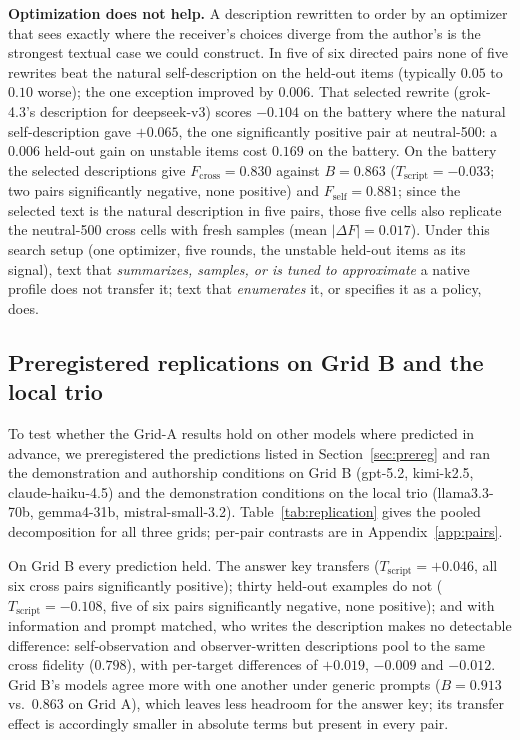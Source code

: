 \documentclass[11pt]{article}
\newcommand{\Fself}{F_{\mathrm{self}}}
\newcommand{\Fcross}{F_{\mathrm{cross}}}
\newcommand{\B}{B}
\newcommand{\Tscript}{T_{\mathrm{script}}}
\begin{document}
\textbf{Optimization does not help.} A description rewritten to order by an
optimizer that sees exactly where the receiver's choices diverge from the
author's is the strongest textual case we could construct. In five of six
directed pairs none of five rewrites beat the natural self-description on
the held-out items (typically $0.05$ to $0.10$ worse); the one exception
improved by $0.006$. That selected rewrite (grok-4.3's description for
deepseek-v3) scores $-0.104$ on the battery where the natural self-description gave $+0.065$,
the one significantly positive pair at neutral-500: a $0.006$
held-out gain on unstable items cost $0.169$ on the battery. On the battery
the selected descriptions give
$\Fcross = 0.830$ against $\B = 0.863$ ($\Tscript = -0.033$; two pairs
significantly negative, none positive) and $\Fself = 0.881$; since the
selected text is the natural description in five pairs, those five cells
also replicate the neutral-500 cross cells with fresh samples (mean
$|\Delta F| = 0.017$). Under this search setup (one optimizer, five rounds,
the unstable held-out items as its signal), text that \emph{summarizes,
samples, or is tuned to approximate} a native profile does not transfer it;
text that \emph{enumerates} it, or specifies it as a policy, does.

\subsection{Preregistered replications on Grid B and the local trio}
\label{sec:replication}
To test whether the Grid-A results hold on other models where predicted in
advance, we preregistered the predictions
listed in Section~\ref{sec:prereg} and ran the demonstration
and authorship conditions on Grid B (gpt-5.2, kimi-k2.5, claude-haiku-4.5)
and the demonstration conditions on the local trio (llama3.3-70b,
gemma4-31b, mistral-small-3.2). Table~\ref{tab:replication} gives the pooled
decomposition for all three grids; per-pair contrasts are in
Appendix~\ref{app:pairs}.



On Grid B every prediction held. The answer key transfers
($\Tscript = +0.046$, all six cross pairs significantly positive); thirty
held-out examples do not ($\Tscript = -0.108$, five of six pairs
significantly negative, none positive); and with information and prompt
matched, who writes the description makes no detectable difference:
self-observation and observer-written descriptions pool to the same cross
fidelity ($0.798$), with per-target differences of $+0.019$, $-0.009$ and
$-0.012$. Grid B's models agree more with one another under generic prompts
($\B = 0.913$ vs.\ $0.863$ on Grid A), which leaves less headroom for the
answer key; its transfer effect is accordingly smaller in absolute terms but
present in every pair.
\end{document}
